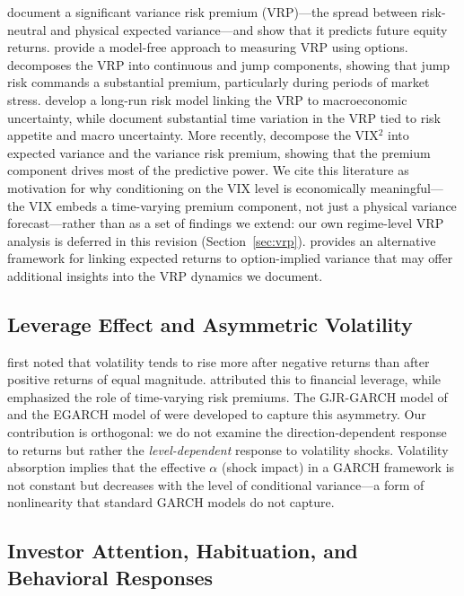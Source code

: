 \documentclass[12pt,a4paper]{article}
\begin{document}
\citet{bollerslev2009} document a significant variance risk premium (VRP)---the spread between risk-neutral and physical expected variance---and show that it predicts future equity returns. \citet{carr2009} provide a model-free approach to measuring VRP using options. \citet{todorov2010} decomposes the VRP into continuous and jump components, showing that jump risk commands a substantial premium, particularly during periods of market stress. \citet{drechsler2011} develop a long-run risk model linking the VRP to macroeconomic uncertainty, while \citet{bekaert2022} document substantial time variation in the VRP tied to risk appetite and macro uncertainty. More recently, \citet{bekaert2014} decompose the VIX$^2$ into expected variance and the variance risk premium, showing that the premium component drives most of the predictive power. We cite this literature as motivation for why conditioning on the VIX level is economically meaningful---the VIX embeds a time-varying premium component, not just a physical variance forecast---rather than as a set of findings we extend: our own regime-level VRP analysis is deferred in this revision (Section~\ref{sec:vrp}). \citet{martin2017} provides an alternative framework for linking expected returns to option-implied variance that may offer additional insights into the VRP dynamics we document.

\subsection{Leverage Effect and Asymmetric Volatility}

\citet{black1976} first noted that volatility tends to rise more after negative returns than after positive returns of equal magnitude. \citet{christie1982} attributed this to financial leverage, while \citet{bekaert2000} emphasized the role of time-varying risk premiums. The GJR-GARCH model of \citet{glosten1993} and the EGARCH model of \citet{nelson1991} were developed to capture this asymmetry. Our contribution is orthogonal: we do not examine the direction-dependent response to returns but rather the \textit{level-dependent} response to volatility shocks. Volatility absorption implies that the effective $\alpha$ (shock impact) in a GARCH framework is not constant but decreases with the level of conditional variance---a form of nonlinearity that standard GARCH models do not capture.

\subsection{Investor Attention, Habituation, and Behavioral Responses}
\end{document}
